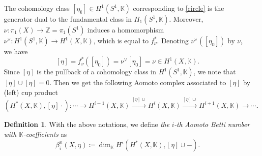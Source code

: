 \documentclass[12pt,leqno,twoside]{amsart}
\theoremstyle{plain}
\theoremstyle{definition}
\newtheorem{defn}[theorem]{Definition}
\def\bd{\begin{defn}}
\def\ed{\end{defn}}
\newcommand{\Z}{\mathbb{Z}}
\newcommand{\K}{\mathbb{K}}
\begin{document}
The cohomology class $[\eta_0]\in H^1(S^1, \K)$ corresponding to \eqref{circle} is the generator dual to the fundamental class in $H_1(S^1, \K)$. Moreover, $\nu\colon \pi_1(X)\to \Z=\pi_1(S^1)$ induces a homomorphism $\nu^\vee: H^1(S^1, \K)\to H^1(X, \K)$, which is equal to $f_\nu^*$. Denoting $\nu^\vee([\eta_0])$ by $\nu$, we have 
\begin{equation}\label{cochain}
[\eta]=f_\nu^*([\eta_0])=\nu^\vee[\eta_0]=\nu\in H^1(X, \K).
\end{equation}
Since $[\eta]$ is the pullback of a cohomology class in $H^1(S^1,\K)$, we note that  $[\eta] \cup [\eta]=0$. 
Then we get the following Aomoto complex associated to $[\eta]$ by (left) cup product
$$
(H^{\ast}(X,\K), [\eta]\cdot)\colon \cdots \to H^{i-1}(X,\K) \xrightarrow{[\eta]\cup}  H^{i}(X,\K)\xrightarrow{[\eta]\cup}  H^{i+1}(X,\K)\to \cdots.
$$

\bd 
With the above notations, we define {\it  the $i$-th Aomoto Betti number with $\K$-coefficients} as
\[ \beta^\K_{i}(X,\eta)\coloneqq\dim_{\K}H^{i}(H^{\ast}(X,\K), [\eta]\cup -). \]
\ed
\end{document}
